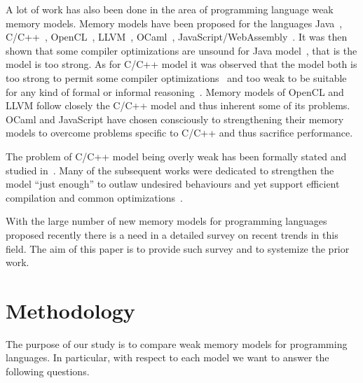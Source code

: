 \documentclass[a4paper,twoside,11pt]{article}
\numberwithin{equation}{section}
\begin{document}
A lot of work has also been done in the area of programming language weak memory models.
Memory models have been proposed for the languages
Java~\cite{Manson-al:POPL05}, C/C++~\cite{Boehm-Adve:PLDI08, Batty-al:POPL11}, 
OpenCL~\cite{Batty-el:POPL16}, LLVM~\cite{Chakraborty-Vafeiadis:CGO17}, 
OCaml~\cite{Dolan-al:PLDI18}, JavaScript/WebAssembly~\cite{Watt-el:PLDI2020}.
It was then shown that some compiler optimizations are unsound 
for Java model~\cite{Sevcik-Aspinall:ECOOP08}, that is the model is too strong.
As for C/C++ model it was observed that the model both is too strong 
to permit some compiler optimizations~\cite{Vafeiadis-al:POPL15} and too weak to 
be suitable for any kind of formal or informal reasoning~\cite{Boehm-Demsky:MSPC14}. 
Memory models of OpenCL and LLVM follow closely the C/C++ model
and thus inherent some of its problems.
OCaml and JavaScript have chosen consciously to strengthening their memory models
to overcome problems specific to C/C++ and thus sacrifice performance. 

The problem of C/C++ model being overly weak  has 
been formally stated and studied in~\cite{Batty-al:ESOP15}.
Many of the subsequent works were dedicated 
to strengthen the model ``just enough'' to outlaw undesired behaviours
and yet support efficient compilation and 
common optimizations~\cite{Jeffrey-Riely:LICS16, PichonPharabod-Sewell:POPL16, 
Podkopaev-al:CoRR16, Kang-al:POPL17, Chakraborty-Vafeiadis:POPL19, Lee-el:PLDI20}. 

With the large number of new memory models for programming languages
proposed recently there is a need in a detailed survey on recent trends in this field.
The aim of this paper is to provide such survey and to systemize the prior work.
 

\section{Methodology}

The purpose of our study is to compare weak memory models for programming languages.
In particular, with respect to each model we want to answer the following questions.
\end{document}
